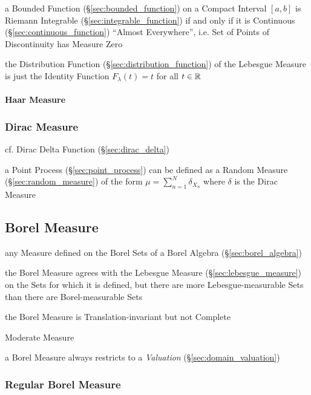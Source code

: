 a Bounded Function (\S\ref{sec:bounded_function}) on a Compact Interval $[a,b]$
is Riemann Integrable (\S\ref{sec:integrable_function}) if and only if it is
Continuous (\S\ref{sec:continuous_function}) ``Almost Everywhere'', i.e. Set of
Points of Discontinuity has Measure Zero

the Distribution Function (\S\ref{sec:distribution_function}) of the Lebesgue
Measure is just the Identity Function $F_\lambda(t) = t$ for all $t \in \mathbb{R}$



\paragraph{Haar Measure}\label{sec:haar_measure}\hfill



\subsubsection{Dirac Measure}\label{sec:dirac_measure}

cf. Dirac Delta Function (\S\ref{sec:dirac_delta})

a Point Process (\S\ref{sec:point_process}) can be defined as a Random Measure
(\S\ref{sec:random_measure}) of the form $\mu = \sum_{n=1}^N \delta_{X_n}$ where
$\delta$ is the Dirac Measure



\subsection{Borel Measure}\label{sec:borel_measure}

any Measure defined on the Borel Sets of a Borel Algebra
(\S\ref{sec:borel_algebra})

the Borel Measure agrees with the Lebesgue Measure
(\S\ref{sec:lebesgue_measure}) on the Sets for which it is defined, but there
are more Lebesgue-measurable Sets than there are Borel-measurable Sets

the Borel Measure is Translation-invariant but not Complete

Moderate Measure

\fist a Borel Measure always restricts to a \emph{Valuation}
(\S\ref{sec:domain_valuation})



\subsubsection{Regular Borel Measure}\label{sec:regualr_borel}\hfill


